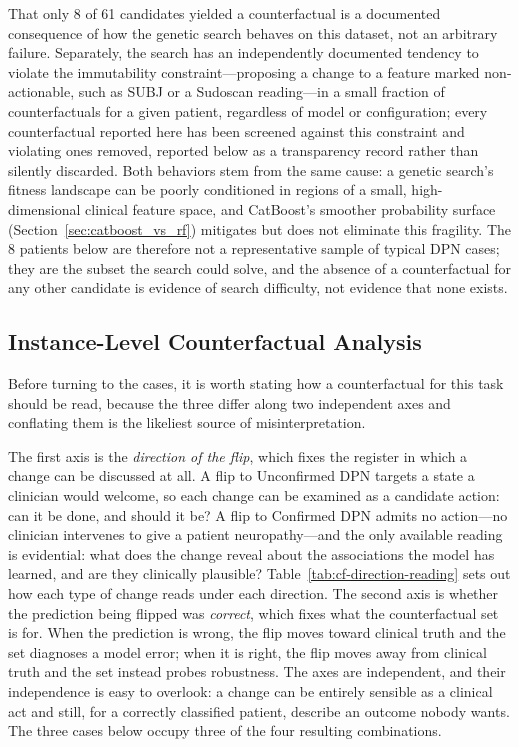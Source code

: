 \documentclass[pdflatex,sn-mathphys-num]{sn-jnl}%
\theoremstyle{thmstyleone}%
\theoremstyle{thmstyletwo}%
\theoremstyle{thmstylethree}%
\begin{document}
That only 8 of 61 candidates yielded a counterfactual is a documented consequence of how the genetic
search behaves on this dataset, not an arbitrary failure. Separately, the search has an independently
documented tendency to violate the immutability constraint---proposing a change to a feature marked
non-actionable, such as SUBJ or a Sudoscan reading---in a small fraction of counterfactuals for a
given patient, regardless of model or configuration; every counterfactual reported here has been
screened against this constraint and violating ones removed, reported below as a transparency record
rather than silently discarded. Both behaviors stem from the same cause: a genetic search's fitness
landscape can be poorly conditioned in regions of a small, high-dimensional clinical feature space,
and CatBoost's smoother probability surface (Section~\ref{sec:catboost_vs_rf}) mitigates but does not
eliminate this fragility. The 8 patients below are therefore not a representative sample of typical
DPN cases; they are the subset the search could solve, and the absence of a counterfactual for any
other candidate is evidence of search difficulty, not evidence that none exists.

\subsection{Instance-Level Counterfactual Analysis}
\label{sec:instance-level-cf}
Before turning to the cases, it is worth stating how a counterfactual for this task should be read,
because the three differ along two independent axes and conflating them is the likeliest source of
misinterpretation.

The first axis is the \emph{direction of the flip}, which fixes the register in which a change can be
discussed at all. A flip to Unconfirmed DPN targets a state a clinician would welcome, so each change
can be examined as a candidate action: can it be done, and should it be? A flip to Confirmed DPN
admits no action---no clinician intervenes to give a patient neuropathy---and the only available
reading is evidential: what does the change reveal about the associations the model has learned, and
are they clinically plausible? Table~\ref{tab:cf-direction-reading} sets out how each type of change
reads under each direction. The second axis is whether the prediction being flipped was
\emph{correct}, which fixes what the counterfactual set is for. When the prediction is wrong, the flip
moves toward clinical truth and the set diagnoses a model error; when it is right, the flip moves away
from clinical truth and the set instead probes robustness. The axes are independent, and their
independence is easy to overlook: a change can be entirely sensible as a clinical act and still, for a
correctly classified patient, describe an outcome nobody wants. The three cases below occupy three of
the four resulting combinations.
\end{document}
